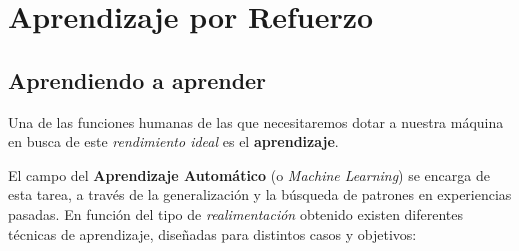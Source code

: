 \chapter{Aprendizaje por Refuerzo}
\label{cap:reinforcementLearning}



\section{Aprendiendo a aprender}

Una de las funciones humanas de las que necesitaremos dotar a nuestra máquina en busca de este \textit{rendimiento ideal} es el \textbf{aprendizaje}.

El campo del \textbf{Aprendizaje Automático} (o \textit{Machine Learning}) se encarga de esta tarea, a través de la generalización y la búsqueda de patrones en experiencias pasadas. En función del tipo de \textit{realimentación} obtenido existen diferentes técnicas de aprendizaje, diseñadas para distintos casos y objetivos:
